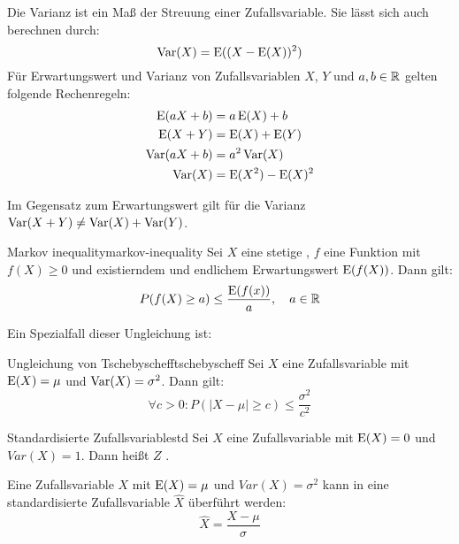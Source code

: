 Die Varianz ist ein Maß der Streuung einer Zufallsvariable. Sie lässt sich auch
berechnen durch:
\[\operatorname{Var}(X) = \operatorname{E}((X-\operatorname{E}(X))^2)\]
Für Erwartungswert und Varianz von Zufallsvariablen $X$, $Y$ und $a,b\in\mathbb{R}$ gelten
folgende Rechenregeln:
\begin{align*}
\operatorname{E}(aX+b) &= a\operatorname{E}(X) + b \\
\operatorname{E}(X+Y) &= \operatorname{E}(X) + \operatorname{E}(Y) \\
\operatorname{Var}(aX+b) &= a^2 \operatorname{Var}(X) \\
\operatorname{Var}(X) &= \operatorname{E}(X^2) - \operatorname{E}(X)^2
\end{align*}

Im Gegensatz zum Erwartungswert gilt für die Varianz $\operatorname{Var}(X+Y) \ne \operatorname{Var}(X) +
\operatorname{Var}(Y)$.

\begin{theorem}{Markov inequality}{markov-inequality}
Sei $X$ eine stetige , $f$ eine Funktion mit
$f(X)\ge 0$ und existierndem und endlichem Erwartungswert $\operatorname{E}(f(X))$. Dann gilt:
\[P(f(X)\ge a)\le \frac{\operatorname{E}(f(x))}{a},\quad a\in\mathbb{R}\]
\end{theorem}
Ein Spezialfall dieser Ungleichung ist:
\begin{theorem}{Ungleichung von Tschebyscheff}{tschebyscheff}
Sei $X$ eine Zufallsvariable mit $\operatorname{E}(X) = \mu$ und $\operatorname{Var}(X) = \sigma^2$. Dann
gilt:
\[\forall c>0: P(|X-\mu|\ge c) \le\frac{\sigma^2}{c^2}\]
\end{theorem}

\begin{definition}{Standardisierte Zufallsvariable}{std}
Sei $X$ eine Zufallsvariable mit $\operatorname{E}(X) = 0$ und $Var(X) = 1$. Dann heißt $Z$
.
\end{definition}

Eine Zufallsvariable $X$ mit $\operatorname{E}(X) = \mu$ und $Var(X)=\sigma^2$ kann in eine
standardisierte Zufallsvariable $\hat{X}$ überführt werden:
\[\hat{X} = \frac{X-\mu}{\sigma}\]
